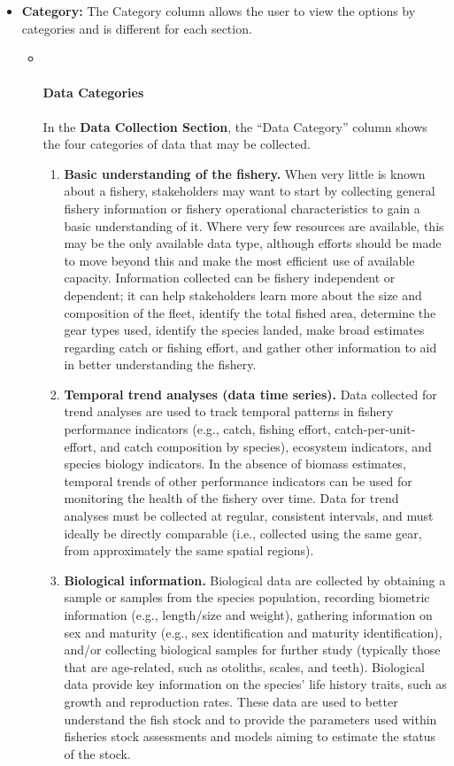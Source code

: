 \documentclass[
  11pt,
]{book}
\providecommand{\tightlist}{%
  \setlength{\itemsep}{0pt}\setlength{\parskip}{0pt}}
\begin{document}
\begin{itemize}
\item
  \textbf{Category:} The Category column allows the user to view the options by categories and is different for each section.

  \begin{itemize}
  \item ~
    \hypertarget{data-categories}{%
    \paragraph{Data Categories}\label{data-categories}}

    In the \textbf{Data Collection Section}, the ``Data Category'' column shows the four categories of data that may be collected.

    \begin{enumerate}
    \def\labelenumi{\alph{enumi}.}
    \tightlist
    \item
      \textbf{Basic understanding of the fishery.} When very little is known about a fishery, stakeholders may want to start by collecting general fishery information or fishery operational characteristics to gain a basic understanding of it. Where very few resources are available, this may be the only available data type, although efforts should be made to move beyond this and make the most efficient use of available capacity. Information collected can be fishery independent or dependent; it can help stakeholders learn more about the size and composition of the fleet, identify the total fished area, determine the gear types used, identify the species landed, make broad estimates regarding catch or fishing effort, and gather other information to aid in better understanding the fishery.
    \item
      \textbf{Temporal trend analyses (data time series).} Data collected for trend analyses are used to track temporal patterns in fishery performance indicators (e.g., catch, fishing effort, catch-per-unit-effort, and catch composition by species), ecosystem indicators, and species biology indicators. In the absence of biomass estimates, temporal trends of other performance indicators can be used for monitoring the health of the fishery over time. Data for trend analyses must be collected at regular, consistent intervals, and must ideally be directly comparable (i.e., collected using the same gear, from approximately the same spatial regions).
    \item
      \textbf{Biological information.} Biological data are collected by obtaining a sample or samples from the species population, recording biometric information (e.g., length/size and weight), gathering information on sex and maturity (e.g., sex identification and maturity identification), and/or collecting biological samples for further study (typically those that are age-related, such as otoliths, scales, and teeth). Biological data provide key information on the species' life history traits, such as growth and reproduction rates. These data are used to better understand the fish stock and to provide the parameters used within fisheries stock assessments and models aiming to estimate the status of the stock.

\end{enumerate}
\end{itemize}
\end{itemize}
\end{document}
